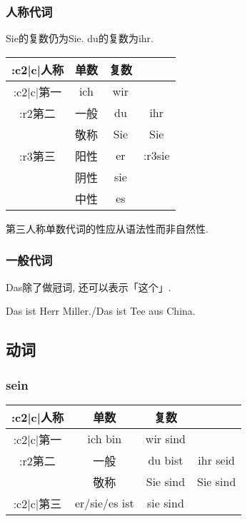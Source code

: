 \documentclass[hidelinks]{ctexart}
\begin{document}
\subsubsection{人称代词} %
\label{ssub:人称代词}

Sie的复数仍为Sie. du的复数为ihr.
\begin{longtable}{|c|c|c|c|}
    \hline
    \+:c2{|c|}{人称} & 单数 & 复数 \\
    \hline
    \+:c2{|c|}{第一} & ich & wir \\
    \hline
    \+:r2{第二} & 一般 & du & ihr \\
    & 敬称 & Sie & Sie \\
    \hline
    \+:r3{第三} & 阳性 & er & \+:r3{sie} \\
    & 阴性 & sie & \\
    & 中性 & es & \\
    \hline
\end{longtable}
\begin{pitfall}
    第三人称单数代词的性应从语法性而非自然性.
\end{pitfall}


\subsubsection{一般代词} %
\label{ssub:一般代词}

Das除了做冠词, 还可以表示「这个」.
\begin{sample}
    \begin{linguaex}
        Das ist Herr Miller./Das ist Tee aus China.
    \end{linguaex}
\end{sample}



\subsection{动词} %
\label{sub:动词}

\subsubsection{sein} %
\label{ssub:sein}

\begin{longtable}{|c|c|c|c|}
    \hline
    \+:c2{|c|}{人称} & 单数 & 复数 \\
    \hline
    \+:c2{|c|}{第一} & ich bin & wir sind \\
    \hline
    \+:r2{第二} & 一般 & du bist & ihr seid \\
    & 敬称 & Sie sind & Sie sind \\
    \hline
    \+:c2{|c|}{第三}  & er/sie/es ist & sie sind \\
    \hline
\end{longtable}
\end{document}
